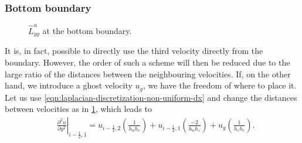 \documentclass{article}
\numberwithin{equation}{section}
\begin{document}
\subsubsection{Bottom boundary}\label{subsubsec:laplacian-bottom}
\begin{figure}[H] %
  \caption{$\hat{L}^u_{yy}$ at the bottom boundary.}\label{fig:luxx-bottom}
\end{figure}
It is, in fact, possible to directly use the third velocity directly from the boundary. However, the order of such a scheme will then be reduced due to the large ratio of the distances between the neighbouring velocities. If, on the other hand, we introduce a ghost velocity $u_g$, we have the freedom of where to place it. Let us use \cref{eqn:laplacian-discretization-non-uniform-dx} and change the distances between velocities as in \cref{fig:luxx-bottom}, which leads to
\begin{equation}
\begin{aligned}
&\left.\frac{\partial^ 2 u}{\partial y^2}\right|_{i-\frac{1}{2},1}=u_{i-\frac{1}{2},2}\left(\frac{1}{h_n h_c}\right)+u_{i-\frac{1}{2},1}\left(\frac{-2}{h_n h_s}\right)+u_g\left(\frac{1}{h_s h_c}\right).\\
\end{aligned}
\end{equation}
\end{document}
